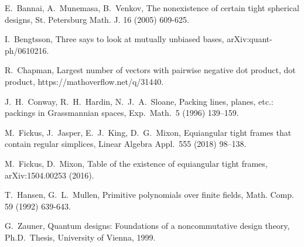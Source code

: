 \documentclass[3p,11pt]{elsarticle}
\theoremstyle{definition}
\begin{document}
%
%
\begin{thebibliography}{WW}

E.\ Bannai, A.\ Munemasa, B.\ Venkov, The nonexistence of certain tight spherical designs, St. Petersburg Math. J. 16 (2005) 609-625.

I.\ Bengtsson, Three says to look at mutually unbiased bases, arXiv:quant-ph/0610216.

R.\ Chapman, Largest   number   of   vectors   with   pairwise   negative dot   product,  dot   product, https://mathoverflow.net/q/31440.

J.\ H.\ Conway, R.\ H.\ Hardin, N.\ J.\ A.\ Sloane,
Packing lines, planes, etc.: packings in Grassmannian spaces,
Exp.\ Math.\ 5 (1996) 139--159.

M.~Fickus, J.~Jasper, E.~J.~King, D.~G.~Mixon,
Equiangular tight frames that contain regular simplices, Linear Algebra Appl.\ 555 (2018) 98--138.

M.\ Fickus, D.\ Mixon, Table of the existence of equiangular tight frames, arXiv:1504.00253 (2016).

T.\ Hansen, G.\ L.\ Mullen, Primitive polynomials over finite fields, Math. Comp. 59 (1992) 639-643.

G.~Zauner,
Quantum designs: Foundations of a noncommutative design theory,
Ph.D.\ Thesis, University of Vienna, 1999.

\end{thebibliography}
\end{document}
